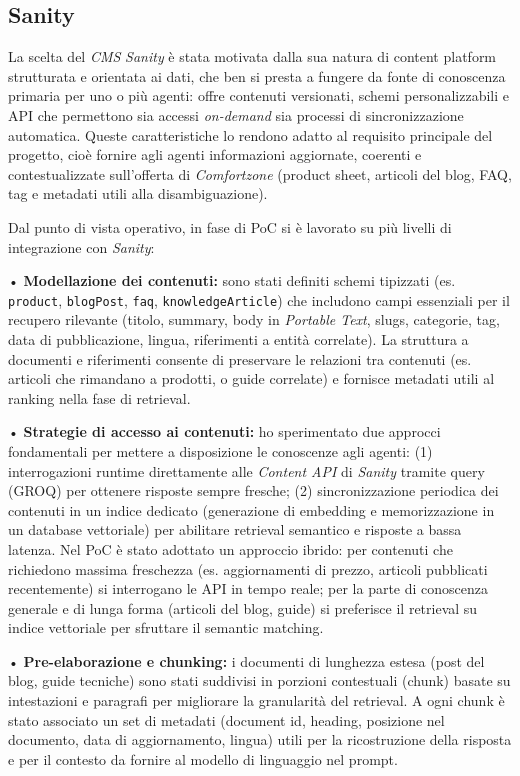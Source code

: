 \subsection{Sanity}

La scelta del \emph{CMS} \emph{Sanity} è stata motivata dalla sua natura di content platform strutturata e orientata ai dati, che ben si presta a fungere da fonte di conoscenza 
primaria per uno o più agenti: offre contenuti versionati, schemi personalizzabili e API che permettono sia accessi \emph{on-demand} sia processi di sincronizzazione automatica. 
Queste caratteristiche lo rendono adatto al requisito principale del progetto, cioè fornire agli agenti informazioni aggiornate, coerenti e contestualizzate sull'offerta di 
\emph{Comfortzone} (product sheet, articoli del blog, FAQ, tag e metadati utili alla disambiguazione).

Dal punto di vista operativo, in fase di PoC si è lavorato su più livelli di integrazione con \emph{Sanity}:

• \textbf{Modellazione dei contenuti:} sono stati definiti schemi tipizzati (es. \texttt{product}, \texttt{blogPost}, \texttt{faq}, \texttt{knowledgeArticle}) che includono campi essenziali per 
il recupero rilevante (titolo, summary, body in \emph{Portable Text}, slugs, categorie, tag, data di pubblicazione, lingua, riferimenti a entità correlate). 
La struttura a documenti e riferimenti consente di preservare le relazioni tra contenuti (es. articoli che rimandano a prodotti, o guide correlate) 
e fornisce metadati utili al ranking nella fase di retrieval.

• \textbf{Strategie di accesso ai contenuti:} ho sperimentato due approcci fondamentali per mettere a disposizione le conoscenze agli agenti: 
(1) interrogazioni runtime direttamente alle \emph{Content API} di \emph{Sanity} tramite query (GROQ) per ottenere risposte sempre fresche; 
(2) sincronizzazione periodica dei contenuti in un indice dedicato (generazione di embedding e memorizzazione in un database vettoriale) 
per abilitare retrieval semantico e risposte a bassa latenza. Nel PoC è stato adottato un approccio ibrido: per contenuti che richiedono massima freschezza 
(es. aggiornamenti di prezzo, articoli pubblicati recentemente) si interrogano le API in tempo reale; per la parte di conoscenza generale e di lunga forma (articoli del blog, guide) 
si preferisce il retrieval su indice vettoriale per sfruttare il semantic matching.

• \textbf{Pre-elaborazione e chunking:} i documenti di lunghezza estesa (post del blog, guide tecniche) sono stati suddivisi in porzioni contestuali (chunk) 
basate su intestazioni e paragrafi per migliorare la granularità del retrieval. A ogni chunk è stato associato un set di metadati 
(document id, heading, posizione nel documento, data di aggiornamento, lingua) utili per la ricostruzione della risposta e per il contesto da fornire al modello di linguaggio nel prompt.

